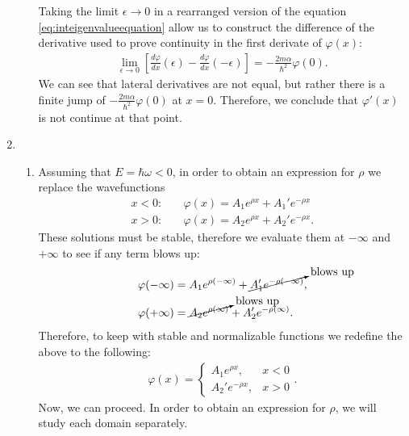 \documentclass[letterpaper,11pt,twoside]{article}
\begin{document}
\begin{enumerate}[itemsep=0pt,topsep=0pt,label=(\alph*)]
\begin{enumerate}[itemsep=0pt,topsep=0pt,label=(a.\arabic*)]
    Taking the limit $\epsilon\to0$ in a rearranged version of the equation \eqref{eq:inteigenvalueequation} allow us to construct the difference of the 
    derivative used to prove continuity in the first derivate of $\varphi(x)$:
    \begin{align}
      \lim_{\epsilon\to0}\left[\frac{d\varphi}{dx}(\epsilon)
        -\frac{d\varphi}{dx}(-\epsilon)\right]=-\frac{2m\alpha}{\hbar^2}\varphi(0).
    \end{align}
    We can see that lateral derivatives are not equal, but rather there is a finite jump of $-\frac{2m\alpha}{\hbar^2}\varphi(0)$ at $x=0$. Therefore, we conclude that 
    $\varphi'(x)$ is not continue at that point.
  \end{enumerate}
  \item
    \begin{enumerate}[itemsep=0pt,topsep=0pt,label=(b.\arabic*)]
      \item Assuming that $E=\hbar\omega<0$, in order to obtain an expression for $\rho$ we replace the wavefunctions 
      \begin{align}
        x<0:&\quad\varphi(x)=A_1e^{\rho x}+A_1'e^{-\rho x}\\
        x>0:&\quad\varphi(x)=A_2e^{\rho x}+A_2'e^{-\rho x}.
      \end{align}
      These solutions must be stable, therefore we evaluate them at $-\infty$ and $+\infty$ to see if any term blows up:
      \begin{align*}
        \varphi(-\infty)&=A_1e^{\rho(-\infty)}+\cancelto{\text{blows up}}{A_1'e^{-\rho(-\infty)}},\\
        \varphi(+\infty)&=\cancelto{\text{blows up}}{A_2e^{\rho(\infty)}}+A_2'e^{-\rho(\infty)}.
      \end{align*}
      Therefore, to keep with stable and normalizable functions we redefine the above to the following:
      \begin{align*}
        \varphi(x)=\begin{cases}
          A_1e^{\rho x},&x<0\\
          A_2'e^{-\rho x},&x>0
        \end{cases}.
      \end{align*}
      Now, we can proceed. In order to obtain an expression for $\rho$, we will study each domain separately. 


\end{enumerate}
\end{enumerate}
\end{document}
